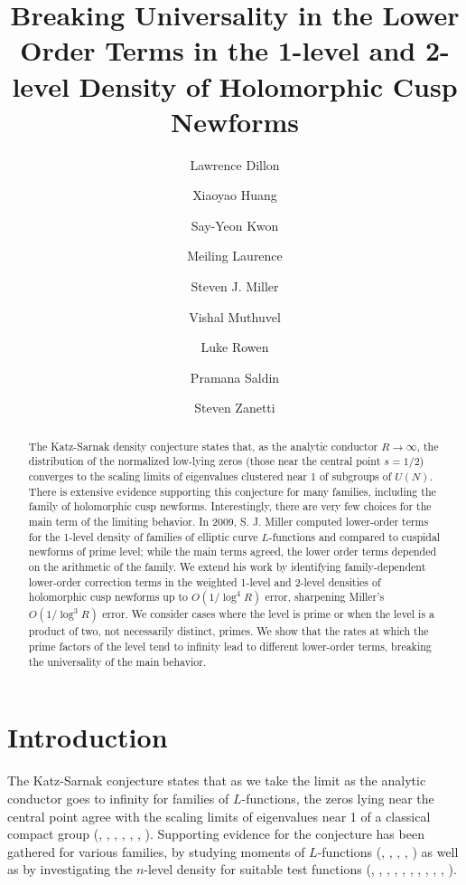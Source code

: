 \documentclass[11pt, reqno]{amsart}
\title[Breaking Universality in the Lower Order Terms in the 1-level and 2-level Density of Holomorphic Cusp Newforms]{Breaking Universality in the Lower Order Terms in the 1-level and 2-level Density of Holomorphic Cusp Newforms}
\author{Lawrence Dillon}
\author{Xiaoyao Huang}
\author{Say-Yeon Kwon}
\author{Meiling Laurence}
\author{Steven J. Miller}
\author{Vishal Muthuvel}
\author{Luke Rowen}
\author{Pramana Saldin}
\author{Steven Zanetti}
\theoremstyle{definition}
\theoremstyle{remark}
\numberwithin{equation}{section}
\begin{document}

\begin{abstract} The Katz-Sarnak density conjecture states that, as the analytic conductor $R \to \infty$, the distribution of the normalized low-lying zeros (those near the central point $s = 1/2$) converges to the scaling limits of eigenvalues clustered near 1 of subgroups of $U(N)$. There is extensive evidence supporting this conjecture for many families, including the family of holomorphic cusp newforms. Interestingly, there are very few choices for the main term of the limiting behavior. In 2009, S. J. Miller computed lower-order terms for the 1-level density of families of elliptic curve $L$-functions and compared to cuspidal newforms of prime level; while the main terms agreed, the lower order terms depended on the arithmetic of the family. We extend his work by identifying family-dependent lower-order correction terms in the weighted 1-level and 2-level densities of holomorphic cusp newforms up to $O\left(1/\log^4 R\right)$ error, sharpening Miller's $O\left(1/\log^3 R\right)$ error. We consider cases where the level is prime or when the level is a product of two, not necessarily distinct, primes. We show 
that the rates at which the prime factors of the level tend to infinity lead to different lower-order terms, breaking the universality of the main behavior.
\end{abstract}


\maketitle
\tableofcontents
\pagestyle{plain}

\section{Introduction}
    The Katz-Sarnak conjecture states that as we take the limit as the analytic conductor goes to infinity for families of $L$-functions, the zeros lying near the central point agree with the scaling limits of eigenvalues near 1 of a classical compact group  (\cite{katz1999random}, \cite{katz1999zeros}, \cite{Hej}, \cite{Mon}, \cite{Od1}, \cite{Od2}, \cite{RS}). Supporting evidence for the conjecture has been gathered for various families, by studying moments of $L$-functions (\cite{CF2000}, \cite{CFKRS2005}, \cite{KeSn1}, \cite{KeSn2}, \cite{KeSn3}) as well as by investigating the $n$-level density for suitable test functions (\cite{DM1}, \cite{FI}, \cite{Gu}, \cite{HR}, \cite{HM}, \cite{Mil2}, \cite{OS}, \cite{RR1}, \cite{Ro}, \cite{Rub}, \cite{Yo2}).
\end{document}
